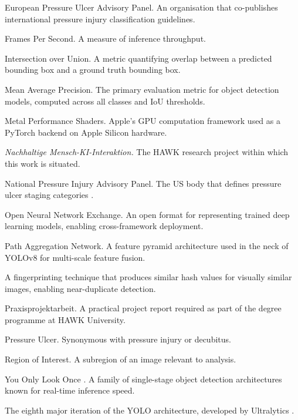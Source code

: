 \documentclass[a4paper,12pt,twoside]{report}
\begin{document}
\begin{description}[leftmargin=4cm, style=nextline]
\item[EPUAP] European Pressure Ulcer Advisory Panel. An organisation that
  co-publishes international pressure injury classification guidelines.

\item[FPS] Frames Per Second. A measure of inference throughput.

\item[IoU] Intersection over Union. A metric quantifying overlap between a
  predicted bounding box and a ground truth bounding box.

\item[mAP] Mean Average Precision. The primary evaluation metric for object
  detection models, computed across all classes and IoU thresholds.

\item[MPS] Metal Performance Shaders. Apple's GPU computation framework used as
  a PyTorch backend on Apple Silicon hardware.

\item[NaMeKI] \textit{Nachhaltige Mensch-KI-Interaktion.} The HAWK research
  project within which this work is situated.

\item[NPUAP] National Pressure Injury Advisory Panel. The US body that defines
  pressure ulcer staging categories \citep{npuap2019staging}.

\item[ONNX] Open Neural Network Exchange. An open format for representing
  trained deep learning models, enabling cross-framework deployment.

\item[PANet] Path Aggregation Network. A feature pyramid architecture used in
  the neck of YOLOv8 for multi-scale feature fusion.

\item[Perceptual Hash] A fingerprinting technique that produces similar hash
  values for visually similar images, enabling near-duplicate detection.

\item[PPA] Praxisprojektarbeit. A practical project report required as part of
  the degree programme at HAWK University.

\item[PU] Pressure Ulcer. Synonymous with pressure injury or decubitus.

\item[ROI] Region of Interest. A subregion of an image relevant to analysis.

\item[YOLO] You Only Look Once \citep{redmon2016yolo}. A family of single-stage
  object detection architectures known for real-time inference speed.

\item[YOLOv8] The eighth major iteration of the YOLO architecture, developed by
  Ultralytics \citep{jocher2023yolov8}.

\end{description}
\end{document}

